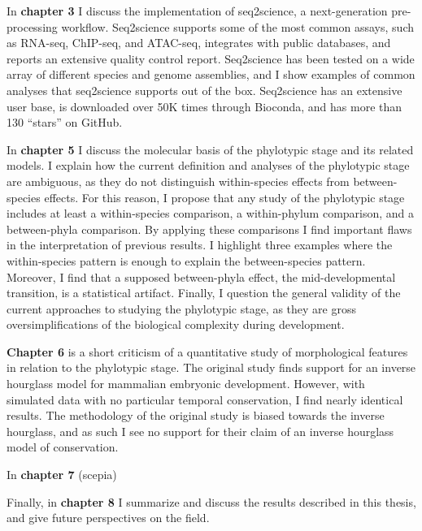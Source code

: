 In \textbf{chapter 3} I discuss the implementation of seq2science, a next-generation pre-processing workflow. Seq2science supports some of the most common assays, such as RNA-seq, ChIP-seq, and ATAC-seq, integrates with public databases, and reports an extensive quality control report. Seq2science has been tested on a wide array of different species and genome assemblies, and I show examples of common analyses that seq2science supports out of the box. Seq2science has an extensive user base\cite{Bright_2021,Xu_2020,Wester2021,SantosBarriopedro2021,Heuts2023,Tholen2023,Harlaar2022,LunaVelez2023,Neikes2023,Vierboom2021,Smits2020,Smits2022,Heuts2022,Rother2023,Ho2023,Sweep2023,vanWigcheren2023,Smits2023}, is downloaded over 50K times through Bioconda, and has more than 130 ``stars'' on GitHub.


In \textbf{chapter 5} I discuss the molecular basis of the phylotypic stage and its related models. I explain how the current definition and analyses of the phylotypic stage are ambiguous, as they do not distinguish within-species effects from between-species effects. For this reason, I propose that any study of the phylotypic stage includes at least a within-species comparison, a within-phylum comparison, and a between-phyla comparison. By applying these comparisons I find important flaws in the interpretation of previous results. I highlight three examples where the within-species pattern is enough to explain the between-species pattern. Moreover, I find that a supposed between-phyla effect, the mid-developmental transition, is a statistical artifact. Finally, I question the general validity of the current approaches to studying the phylotypic stage, as they are gross oversimplifications of the biological complexity during development.

\textbf{Chapter 6} is a short criticism of a quantitative study of morphological features in relation to the phylotypic stage. The original study finds support for an inverse hourglass model for mammalian embryonic development. However, with simulated data with no particular temporal conservation, I find nearly identical results. The methodology of the original study is biased towards the inverse hourglass, and as such I see no support for their claim of an inverse hourglass model of conservation.

In \textbf{chapter 7} (scepia)

Finally, in \textbf{chapter 8} I summarize and discuss the results described in this thesis, and give future perspectives on the field.
